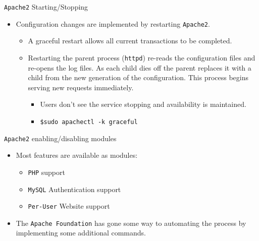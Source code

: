 \documentclass[xcolor=table,aspectratio=169]{beamer}
\begin{document}
\begin{frame}{\texttt{Apache2} Starting/Stopping}
  \begin{itemize}
    \item Configuration changes are implemented by restarting \texttt{Apache2}.
      \begin{itemize}
        \item A graceful restart allows all current transactions to be completed. 
        \item Restarting the parent process (\texttt{httpd}) re-reads the configuration files and re-opens the log files. As each child dies off the parent replaces it with a child from the new generation of the configuration. This process begins serving new requests immediately.
          \begin{itemize}
            \item Users don't see the service stopping and availability is maintained.
            \item \texttt{\$sudo apachectl -k graceful}
          \end{itemize}
      \end{itemize}
    \end{itemize}
\end{frame}

\begin{frame}{\texttt{Apache2} enabling/disabling modules}
  \begin{itemize}
    \item Most features are available as modules:
      \begin{itemize}
        \item \texttt{PHP} support
        \item \texttt{MySQL} Authentication support
        \item \texttt{Per-User} Website support
      \end{itemize}
    \item The \texttt{Apache Foundation} has gone some way to automating the process by implementing some additional commands.
  \end{itemize}
\end{frame}
\end{document}
